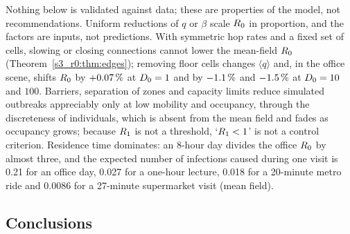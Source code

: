 Nothing below is validated against data; these are properties of the model, not recommendations. Uniform
reductions of $q$ or $\beta$ scale $R_0$ in proportion, and the factors are inputs, not predictions. With
symmetric hop rates and a fixed set of cells, slowing or closing connections cannot lower the mean-field $R_0$
(Theorem~\ref{s3_r0:thm:edges}); removing floor cells changes $\langle q\rangle$ and, in the office scene, shifts
$R_0$ by $+0.07\,\%$ at $D_0=1$ and by $-1.1\,\%$ and $-1.5\,\%$ at $D_0=10$ and $100$. Barriers, separation of
zones and capacity limits reduce simulated outbreaks appreciably only at low mobility and occupancy, through the
discreteness of individuals, which is absent from the mean field and fades as occupancy grows; because $R_1$ is
not a threshold, `$R_1<1$' is not a control criterion. Residence time dominates: an 8-hour day divides the
office $R_0$ by almost three, and the expected number of infections caused during one visit is 0.21 for an office
day, 0.027 for a one-hour lecture, 0.018 for a 20-minute metro ride and 0.0086 for a 27-minute supermarket visit
(mean field).

\subsection{Conclusions}\label{s9_discussion:sec:conclusions}

